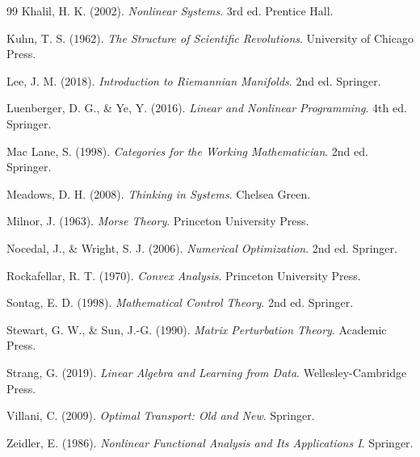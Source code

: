 \documentclass[12pt,oneside]{article}
\theoremstyle{plain}
\theoremstyle{definition}
\theoremstyle{remark}
\begin{document}
\begin{thebibliography}{99}
Khalil, H. K. (2002).
\textit{Nonlinear Systems}.
3rd ed.
Prentice Hall.

Kuhn, T. S. (1962).
\textit{The Structure of Scientific Revolutions}.
University of Chicago Press.

Lee, J. M. (2018).
\textit{Introduction to Riemannian Manifolds}.
2nd ed.
Springer.

Luenberger, D. G.,
\& Ye, Y. (2016).
\textit{Linear and Nonlinear Programming}.
4th ed.
Springer.

Mac Lane, S. (1998).
\textit{Categories for the Working Mathematician}.
2nd ed.
Springer.

Meadows, D. H. (2008).
\textit{Thinking in Systems}.
Chelsea Green.

Milnor, J. (1963).
\textit{Morse Theory}.
Princeton University Press.

Nocedal, J.,
\& Wright, S. J. (2006).
\textit{Numerical Optimization}.
2nd ed.
Springer.

Rockafellar, R. T. (1970).
\textit{Convex Analysis}.
Princeton University Press.

Sontag, E. D. (1998).
\textit{Mathematical Control Theory}.
2nd ed.
Springer.

Stewart, G. W.,
\& Sun, J.-G. (1990).
\textit{Matrix Perturbation Theory}.
Academic Press.

Strang, G. (2019).
\textit{Linear Algebra and Learning from Data}.
Wellesley-Cambridge Press.

Villani, C. (2009).
\textit{Optimal Transport: Old and New}.
Springer.

Zeidler, E. (1986).
\textit{Nonlinear Functional Analysis and Its Applications I}.
Springer.

\end{thebibliography}
\end{document}
